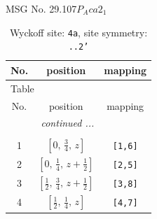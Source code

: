 \documentclass[fleqn,8pt]{jsarticle}
\begin{document}
\setcounter{MaxMatrixCols}{32}

\renewcommand{\tablename}{Table~}
\renewcommand{\figurename}{Figure~}
\begin{center}
\LARGE
MSG No. 29.107\quad$P_{A}ca2_{1}$
\end{center}
\renewcommand{\arraystretch}{1.2}
\begin{longtable}{ccc}
\caption{Wyckoff site: {\tt 4a}, site symmetry: {\tt ..2'}}
 \\
 \hline \hline
No. & position & mapping \\ \hline \endfirsthead

\multicolumn{2}{l}{\tablename\ \thetable{}} \\
 \hline \hline
No. & position & mapping \\ \hline \endhead

 \hline \hline
\multicolumn{2}{r}{\footnotesize\it continued ...} \\ \endfoot

 \hline \hline
\multicolumn{2}{r}{} \\ \endlastfoot

1 & $\left[ 0,\, \frac{3}{4},\, z \right]$ & {\tt [1,6]} \\ \hline
2 & $\left[ 0,\, \frac{1}{4},\, z + \frac{1}{2} \right]$ & {\tt [2,5]} \\ \hline
3 & $\left[ \frac{1}{2},\, \frac{3}{4},\, z + \frac{1}{2} \right]$ & {\tt [3,8]} \\ \hline
4 & $\left[ \frac{1}{2},\, \frac{1}{4},\, z \right]$ & {\tt [4,7]} \\
\end{longtable}
\renewcommand{\arraystretch}{1.2}
\end{document}
